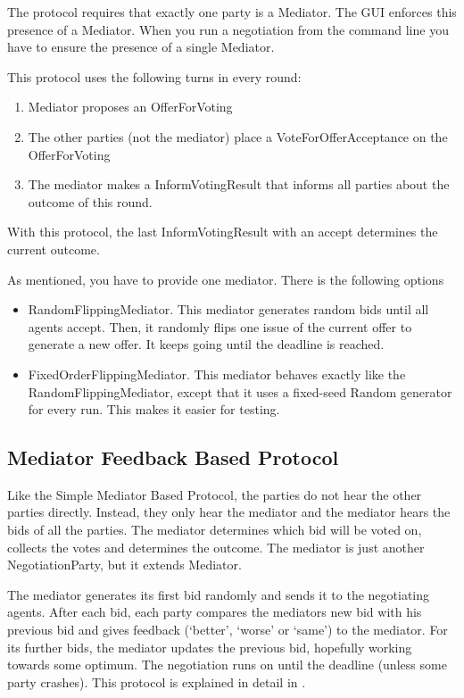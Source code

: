 \documentclass[]{article}
\newcommand*\vtick{\textsc{\char13}}
\begin{document}
The protocol requires that exactly one party is a Mediator. The \Genius GUI enforces this presence of a Mediator. When you run a negotiation from the command line you have to ensure the presence of a single Mediator.

This protocol uses the following turns in every round:
\begin{enumerate}
\item Mediator proposes an OfferForVoting
\item The other parties (not the mediator) place a VoteForOfferAcceptance on the OfferForVoting
\item The mediator makes a InformVotingResult that informs all parties about the outcome of this round.
\end{enumerate}

With this protocol, the last InformVotingResult with an accept determines the current outcome. 

As mentioned, you have to provide one mediator. There is the following options 
\begin{itemize}
\item RandomFlippingMediator.   This mediator generates random bids until all agents accept. Then, it
  randomly flips one issue of the current offer to generate a new offer. It
  keeps going until the deadline is reached. 
 \item FixedOrderFlippingMediator.   This mediator behaves exactly like the RandomFlippingMediator, except that it uses a fixed-seed Random generator for every run. This makes it easier for testing. 

\end{itemize}

\subsection{Mediator  Feedback Based Protocol}
Like the Simple Mediator Based Protocol, the parties do not hear the other parties directly. Instead, they only hear the mediator and the mediator hears the bids of all the parties. The mediator determines which bid will be voted on, collects the votes and determines the outcome. The mediator is just another NegotiationParty, but it extends Mediator.

 The mediator generates its first bid randomly and sends it to the negotiating agents. After each bid, each party compares the mediator\vtick s new bid with his previous bid and gives feedback (`better', `worse' or `same')  to the mediator. For its further bids, the mediator updates the previous bid, hopefully working towards some optimum. The negotiation runs on until the deadline (unless some party crashes). This protocol is explained in detail in \cite{MultiMediatedNegoProtocolsWithFeedback}.
\end{document}
